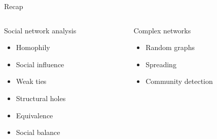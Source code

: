 \documentclass[hide notes,compress]{beamer}
\begin{document}
\begin{frame}[c]{Recap}

  \begin{columns}[t]

    \begin{column}{.5\textwidth}
      \begin{block}{Social network analysis}
        \begin{itemize}
          \item Homophily
          \item Social influence
          \item Weak ties
          \item Structural holes
          \item Equivalence
          \item Social balance
        \end{itemize}
      \end{block}
    \end{column}

    \begin{column}{.5\textwidth}
      \begin{block}{Complex networks}
        \begin{itemize}
          \item Random graphs 
          \item Spreading
          \item Community detection
        \end{itemize}
      \end{block}
    \end{column}

  \end{columns}

\end{frame}
\end{document}
